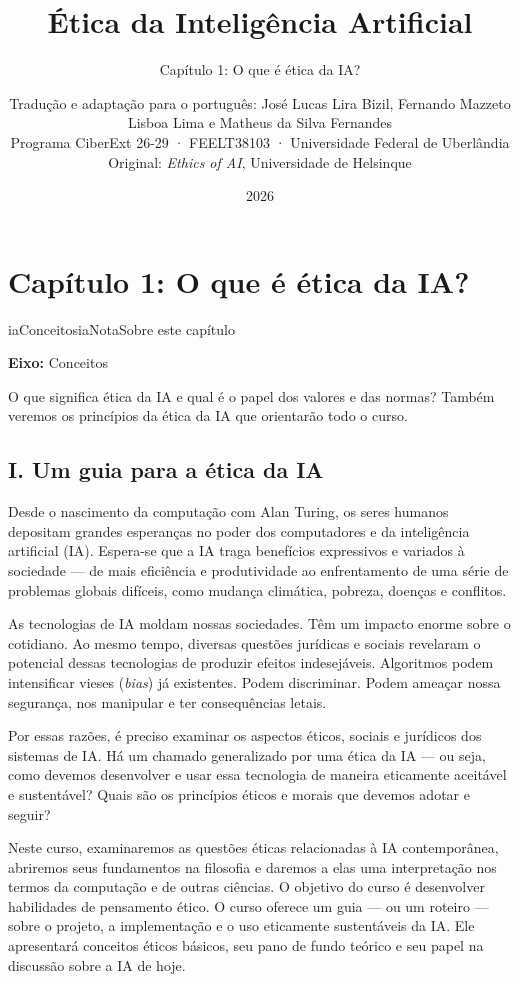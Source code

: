 \documentclass[
  11pt,
]{article}
\title{Ética da Inteligência Artificial}
\subtitle{Capítulo 1: O que é ética da IA?}
\author{Tradução e adaptação para o português: José Lucas Lira Bizil,
Fernando Mazzeto Lisboa Lima e Matheus da Silva Fernandes\\
Programa CiberExt 26-29 · FEELT38103 · Universidade Federal de
Uberlândia\\
Original: \emph{Ethics of AI}, Universidade de Helsinque}
\date{2026}
\newenvironment{nota}[1][Nota]{\begin{iabox}{iaConceitos}{iaNota}{#1}}{\end{iabox}}
\begin{document}
\maketitle

{
\hypersetup{linkcolor=iaConceitos}
\setcounter{tocdepth}{3}
\tableofcontents
}
\section{Capítulo 1: O que é ética da
IA?}\label{capuxedtulo-1-o-que-uxe9-uxe9tica-da-ia}

\begin{nota}[Sobre este capítulo]

\textbf{Eixo:} Conceitos

O que significa ética da IA e qual é o papel dos valores e das normas?
Também veremos os princípios da ética da IA que orientarão todo o curso.

\end{nota}

\subsection{I. Um guia para a ética da
IA}\label{i.-um-guia-para-a-uxe9tica-da-ia}

Desde o nascimento da computação com Alan Turing, os seres humanos
depositam grandes esperanças no poder dos computadores e da inteligência
artificial (IA). Espera-se que a IA traga benefícios expressivos e
variados à sociedade --- de mais eficiência e produtividade ao
enfrentamento de uma série de problemas globais difíceis, como mudança
climática, pobreza, doenças e conflitos.

As tecnologias de IA moldam nossas sociedades. Têm um impacto enorme
sobre o cotidiano. Ao mesmo tempo, diversas questões jurídicas e sociais
revelaram o potencial dessas tecnologias de produzir efeitos
indesejáveis. Algoritmos podem intensificar vieses (\emph{bias}) já
existentes. Podem discriminar. Podem ameaçar nossa segurança, nos
manipular e ter consequências letais.

Por essas razões, é preciso examinar os aspectos éticos, sociais e
jurídicos dos sistemas de IA. Há um chamado generalizado por uma ética
da IA --- ou seja, como devemos desenvolver e usar essa tecnologia de
maneira eticamente aceitável e sustentável? Quais são os princípios
éticos e morais que devemos adotar e seguir?

Neste curso, examinaremos as questões éticas relacionadas à IA
contemporânea, abriremos seus fundamentos na filosofia e daremos a elas
uma interpretação nos termos da computação e de outras ciências. O
objetivo do curso é desenvolver habilidades de pensamento ético. O curso
oferece um guia --- ou um roteiro --- sobre o projeto, a implementação e
o uso eticamente sustentáveis da IA. Ele apresentará conceitos éticos
básicos, seu pano de fundo teórico e seu papel na discussão sobre a IA
de hoje.
\end{document}
